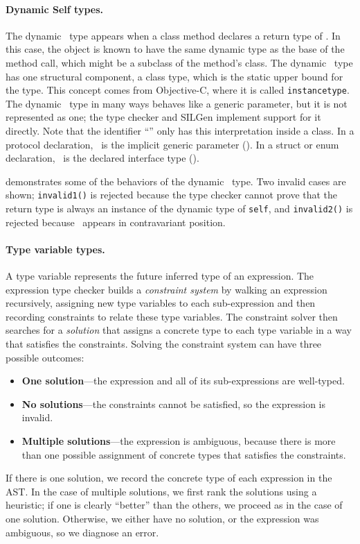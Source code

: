 \documentclass[../generics]{subfiles}
\begin{document}
\paragraph{Dynamic Self types.}
The dynamic \tSelf\ type appears when a class method declares a return type of \tSelf. In this case, the object is known to have the same dynamic type as the base of the method call, which might be a subclass of the method's class. The dynamic \tSelf\ type has one structural component, a class type, which is the static upper bound for the type. This concept comes from Objective-C, where it is called \texttt{instancetype}. The dynamic \tSelf\ type in many ways behaves like a generic parameter, but it is not represented as one; the type checker and SILGen implement support for it directly. Note that the identifier ``\tSelf'' only has this interpretation inside a class. In a protocol declaration, \tSelf\ is the implicit generic parameter (). In a struct or enum declaration, \tSelf\ is the declared interface type ().

 demonstrates some of the behaviors of the dynamic \tSelf\ type. Two invalid cases are shown; \texttt{invalid1()} is rejected because the type checker cannot prove that the return type is always an instance of the dynamic type of \texttt{self}, and \texttt{invalid2()} is rejected because \tSelf\ appears in contravariant position.

\paragraph{Type variable types.}
A type variable represents the future inferred type of an expression. The expression type checker builds a \emph{constraint system} by walking an expression recursively, assigning new type variables to each sub-expression and then recording constraints to relate these type variables. The constraint solver then searches for a \emph{solution} that assigns a concrete type to each type variable in a way that satisfies the constraints. Solving the constraint system can have three possible outcomes:
\begin{itemize}
\item \textbf{One solution}---the expression and all of its sub-expressions are well-typed.
\item \textbf{No solutions}---the constraints cannot be satisfied, so the expression is invalid.
\item \textbf{Multiple solutions}---the expression is ambiguous, because there is more than one possible assignment of concrete types that satisfies the constraints.
\end{itemize}
If there is one solution, we record the concrete type of each expression in the AST. In the case of multiple solutions, we first rank the solutions using a heuristic; if one is clearly ``better'' than the others, we proceed as in the case of one solution. Otherwise, we either have no solution, or the expression was ambiguous, so we diagnose an error.
\end{document}

